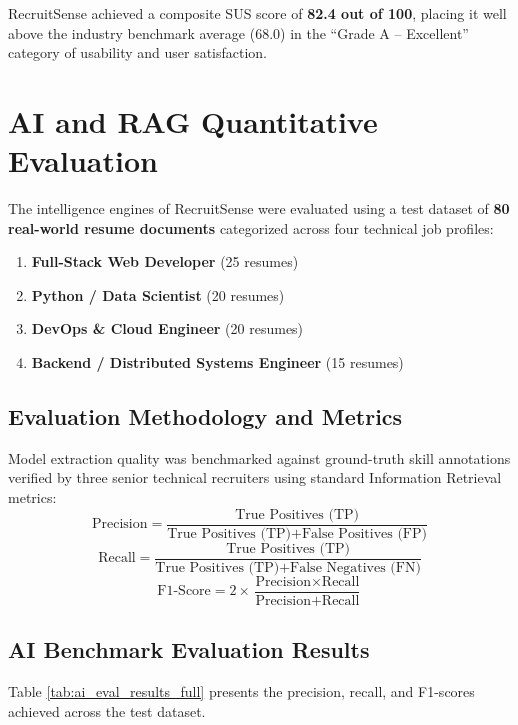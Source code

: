 RecruitSense achieved a composite SUS score of \textbf{82.4 out of 100}, placing it well above the industry benchmark average (68.0) in the ``Grade A -- Excellent'' category of usability and user satisfaction.

\section{AI and RAG Quantitative Evaluation}
The intelligence engines of RecruitSense were evaluated using a test dataset of \textbf{80 real-world resume documents} categorized across four technical job profiles:
\begin{enumerate}
    \item \textbf{Full-Stack Web Developer} (25 resumes)
    \item \textbf{Python / Data Scientist} (20 resumes)
    \item \textbf{DevOps \& Cloud Engineer} (20 resumes)
    \item \textbf{Backend / Distributed Systems Engineer} (15 resumes)
\end{enumerate}

\subsection{Evaluation Methodology and Metrics}
Model extraction quality was benchmarked against ground-truth skill annotations verified by three senior technical recruiters using standard Information Retrieval metrics:
\begin{equation}
    \text{Precision} = \frac{\text{True Positives (TP)}}{\text{True Positives (TP)} + \text{False Positives (FP)}}
\end{equation}
\begin{equation}
    \text{Recall} = \frac{\text{True Positives (TP)}}{\text{True Positives (TP)} + \text{False Negatives (FN)}}
\end{equation}
\begin{equation}
    \text{F1-Score} = 2 \times \frac{\text{Precision} \times \text{Recall}}{\text{Precision} + \text{Recall}}
\end{equation}

\subsection{AI Benchmark Evaluation Results}
Table \ref{tab:ai_eval_results_full} presents the precision, recall, and F1-scores achieved across the test dataset.

